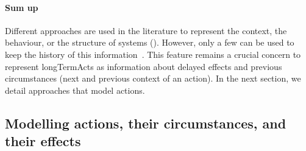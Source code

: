 \paragraph{Sum up}
Different approaches are used in the literature to represent the \gls{context}, the \gls{behaviour}, or the \gls{structure} of systems (\cf {}).
However, only a few can be used to keep the history of this information~\cite{DBLP:conf/seke/0001FNMKT14, DBLP:conf/models/0001FNMKBT14, 	DBLP:conf/dbpl/MoffittS17, DBLP:conf/icse/TaharaOH17, DBLP:conf/pervasive/HenricksenIR02, DBLP:conf/smartgridsec/0001FKNT14}.
This feature remains a crucial concern to represent \glspl{longTermAct} as information about delayed effects and previous \glspl{circumstance} (next and previous \gls{context} of an \gls{action}).
In the next section, we detail approaches that model actions.
	
\vfil

	
\subsection[Modelling actions, their circumstances, and their effects]{Modelling \glspl{action}, their \glspl{circumstance}, and their effects}


